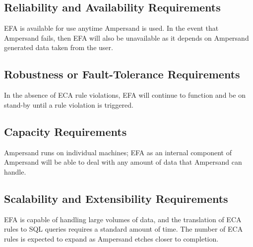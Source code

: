 \subsection{Reliability and Availability Requirements}\label{subsec:AvailReq}
EFA is available for use anytime Ampersand is used. In the event that Ampersand 
fails, then EFA will also be unavailable as it depends on Ampersand generated 
data taken from the user.

\subsection{Robustness or Fault-Tolerance Requirements}\label{subsec:FaultReq}

In the absence of ECA rule violations, EFA will continue to function and be on 
stand-by until a rule violation is triggered.

\subsection{Capacity Requirements}\label{subsec:CapacityReq}
Ampersand runs on individual machines; EFA as an internal component of 
Ampersand will be able to deal with any amount of data that Ampersand can 
handle. 

\subsection{Scalability and Extensibility 
Requirements}\label{subsec:ScalabilityReq}
EFA is capable of handling large volumes of data, and the translation of ECA 
rules to SQL queries requires a standard amount of time. The number of ECA 
rules is expected to expand as Ampersand etches closer to completion. 

